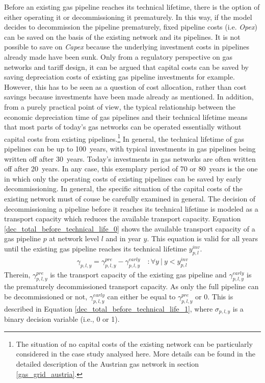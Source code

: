 Before an existing gas pipeline reaches its technical lifetime, there is the option of either operating it or decommissioning it prematurely. In this way, if the model decides to decommission the pipeline prematurely, fixed pipeline costs (i.e. \textit{Opex}) can be saved on the basis of the existing network and its pipelines. It is not possible to save on \textit{Capex} because the underlying investment costs in pipelines already made have been sunk. Only from a regulatory perspective on gas networks and tariff design, it can be argued that capital costs can be saved by saving depreciation costs of existing gas pipeline investments for example. However, this has to be seen as a question of cost allocation, rather than cost savings because investments have been made already as mentioned. In addition, from a purely practical point of view, the typical relationship between the economic depreciation time of gas pipelines and their technical lifetime means that most parts of today's gas networks can be operated essentially without capital costs from existing pipelines.\footnote{The situation of no capital costs of the existing network can be particularly considered in the case study analysed here. More details can be found in the detailed description of the Austrian gas network in section \ref{gas_grid_austria}.} In general, the technical lifetime of gas pipelines can be up to \SI{100}{years}, with typical investments in gas pipelines being written off after \SI{30}{years}. Today's investments in gas networks are often written off after \SI{20}{years}. In any case, this exemplary period of \SI{70}{} or \SI{80}{years} is the one in which only the operating costs of existing pipelines can be saved by early decommissioning. In general, the specific situation of the capital costs of the existing network must of couse be carefully examined in general. The decision of decommissioning a pipeline before it reaches its technical lifetime is modeled as a transport capacity which reduces the available transport capacity. Equation \ref{dec_total_before_technical_life_0} shows the available transport capacity of a gas pipeline $p$ at network level $l$ and in year $y$. This equation is valid for all years until the existing gas pipeline reaches its technical lifetime $y^{inv}_{p,l}$. 
\begin{align}\label{dec_total_before_technical_life_0}
	\gamma_{p,l, y} = \gamma^{pre}_{p,l,y} - \gamma^{early}_{p,l, y} \quad:\forall y~|~y<y^{inv}_{p,l}
\end{align}
Therein, $\gamma^{pre}_{p,l,y}$ is the transport capacity of the existing gas pipeline and $\gamma^{early}_{p,l, y}$ is the prematurely decommissioned transport capacity. As only the full pipeline can be decommissioned or not, $\gamma^{early}_{p,l, y}$ can either be equal to $\gamma^{pre}_{p,l,y}$ or 0. This is described in Equation \ref{dec_total_before_technical_life_1}, where $\sigma_{p,l,y}$ is a binary decision variable (i.e., 0 or 1).
